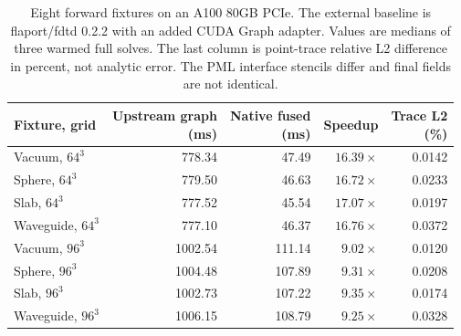 \begin{table}[tbp]
\centering
\small
\renewcommand{\arraystretch}{1.15}
\caption{Eight forward fixtures on an A100 80GB PCIe. The external baseline is flaport/fdtd 0.2.2 with an added CUDA Graph adapter. Values are medians of three warmed full solves. The last column is point-trace relative L2 difference in percent, not analytic error. The PML interface stencils differ and final fields are not identical.}
\label{tab:open-source}
\begin{tabular}{@{}lrrrr@{}}
\toprule
Fixture, grid & \shortstack{Upstream graph\\(ms)} & \shortstack{Native fused\\(ms)} & Speedup & \shortstack{Trace L2\\(\%)} \\
\midrule
Vacuum, $64^3$ & 778.34 & 47.49 & $16.39\times$ & 0.0142 \\
Sphere, $64^3$ & 779.50 & 46.63 & $16.72\times$ & 0.0233 \\
Slab, $64^3$ & 777.52 & 45.54 & $17.07\times$ & 0.0197 \\
Waveguide, $64^3$ & 777.10 & 46.37 & $16.76\times$ & 0.0372 \\
Vacuum, $96^3$ & 1002.54 & 111.14 & $9.02\times$ & 0.0120 \\
Sphere, $96^3$ & 1004.48 & 107.89 & $9.31\times$ & 0.0208 \\
Slab, $96^3$ & 1002.73 & 107.22 & $9.35\times$ & 0.0174 \\
Waveguide, $96^3$ & 1006.15 & 108.79 & $9.25\times$ & 0.0328 \\
\bottomrule
\end{tabular}
\end{table}
